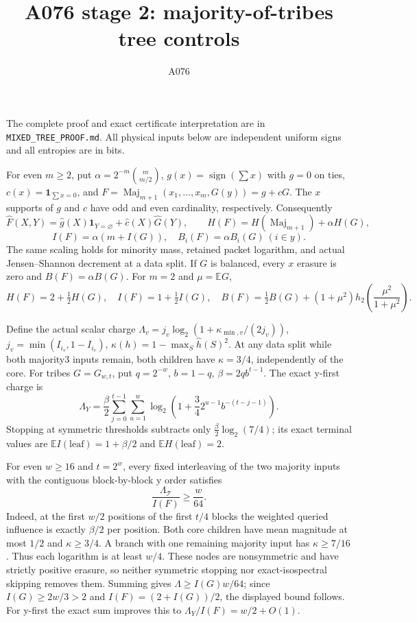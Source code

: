 \documentclass{article}
\begin{document}
\title{A076 stage 2: majority-of-tribes tree controls}\author{A076}\maketitle
The complete proof and exact certificate interpretation are in
\texttt{MIXED\_TREE\_PROOF.md}. All physical inputs below are independent
uniform signs and all entropies are in bits.

For even $m\ge2$, put $\alpha=2^{-m}\binom{m}{m/2}$,
$g(x)=\operatorname{sign}(\sum x)$ with $g=0$ on ties,
$c(x)=\mathbf1_{\sum x=0}$, and
$F=\operatorname{Maj}_{m+1}(x_1,\ldots,x_m,G(y))=g+cG$.
The $x$ supports of $g$ and $c$ have odd and even cardinality,
respectively. Consequently
\[
\widehat F(X,Y)=\widehat g(X)\mathbf1_{Y=\varnothing}
                  +\widehat c(X)\widehat G(Y),\qquad
H(F)=H(\operatorname{Maj}_{m+1})+\alpha H(G),
\]
\[
I(F)=\alpha(m+I(G)),\quad B_i(F)=\alpha B_i(G)\ (i\in y).
\]
The same scaling holds for minority mass, retained packet logarithm,
and actual Jensen--Shannon decrement at a data split. If $G$ is
balanced, every $x$ erasure is zero and $B(F)=\alpha B(G)$.
For $m=2$ and $\mu=\mathbb EG$,
\[
H(F)=2+\tfrac12H(G),\quad I(F)=1+\tfrac12I(G),\quad
B(F)=\tfrac12B(G)+(1+\mu^2)h_2\!\left(\frac{\mu^2}{1+\mu^2}\right).
\]

Define the actual scalar charge
$\Lambda_v=j_v\log_2(1+\kappa_{\min,v}/(2j_v))$,
$j_v=\min(I_{i_v},1-I_{i_v})$,
$\kappa(h)=1-\max_S\widehat h(S)^2$.
At any data split while both majority3 inputs remain, both children
have $\kappa=3/4$, independently of the core.
For tribes $G=G_{w,t}$, put $q=2^{-w}$, $b=1-q$,
$\beta=2qb^{t-1}$. The exact y-first charge is
\[
\Lambda_{Y}=\frac\beta2\sum_{j=0}^{t-1}\sum_{u=1}^{w}
\log_2\left(1+\frac34 2^{u-1}b^{-(t-j-1)}\right).
\]
Stopping at symmetric thresholds subtracts only
$\frac\beta2\log_2(7/4)$; its exact terminal values are
$\mathbb EI(\mathrm{leaf})=1+\beta/2$ and
$\mathbb EH(\mathrm{leaf})=2$.

For even $w\ge16$ and $t=2^w$, every fixed interleaving of the two
majority inputs with the contiguous block-by-block y order satisfies
\[
\boxed{\frac{\Lambda_{\mathcal T}}{I(F)}\ge\frac{w}{64}.}
\]
Indeed, at the first $w/2$ positions of the first $t/4$ blocks the
weighted queried influence is exactly $\beta/2$ per position.
Both core children have mean magnitude at most $1/2$ and
$\kappa\ge3/4$. A branch with one remaining majority input has
$\kappa\ge7/16$. Thus each logarithm is at least $w/4$.
These nodes are nonsymmetric and have strictly positive erasure,
so neither symmetric stopping nor exact-isospectral skipping removes
them. Summing gives $\Lambda\ge I(G)w/64$; since
$I(G)\ge2w/3>2$ and $I(F)=(2+I(G))/2$, the displayed bound follows.
For y-first the exact sum improves this to
$\Lambda_Y/I(F)=w/2+O(1)$.
\end{document}
